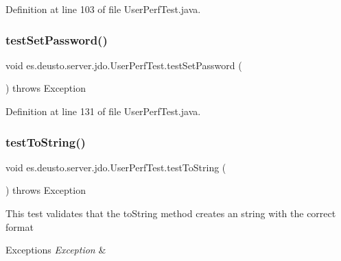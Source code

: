 Definition at line 103 of file User\+Perf\+Test.\+java.

\mbox{\label{classes_1_1deusto_1_1server_1_1jdo_1_1_user_perf_test_a0ed777a0ed7150eb0a748b90959b5d0b}} 
\subsubsection{\texorpdfstring{test\+Set\+Password()}{testSetPassword()}}
{\footnotesize\ttfamily void es.\+deusto.\+server.\+jdo.\+User\+Perf\+Test.\+test\+Set\+Password (\begin{DoxyParamCaption}{ }\end{DoxyParamCaption}) throws Exception}



Definition at line 131 of file User\+Perf\+Test.\+java.

\mbox{\label{classes_1_1deusto_1_1server_1_1jdo_1_1_user_perf_test_a6744a929575c948f3a725bc07ea17dd6}} 
\subsubsection{\texorpdfstring{test\+To\+String()}{testToString()}}
{\footnotesize\ttfamily void es.\+deusto.\+server.\+jdo.\+User\+Perf\+Test.\+test\+To\+String (\begin{DoxyParamCaption}{ }\end{DoxyParamCaption}) throws Exception}

This test validates that the to\+String method creates an string with the correct format 
\begin{DoxyExceptions}{Exceptions}
{\em Exception} & \\
\hline
\end{DoxyExceptions}



